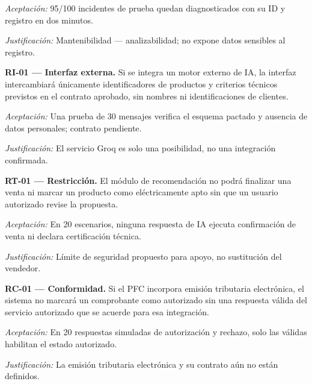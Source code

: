 \noindent\textit{Aceptación:} 95/100 incidentes de prueba quedan diagnosticados con su ID y registro en dos minutos.\par
\noindent\textit{Justificación:} Mantenibilidad — analizabilidad; no expone datos sensibles al registro.\par\medskip
\noindent\textbf{RI-01 — Interfaz externa.} Si se integra un motor externo de IA, la interfaz intercambiará únicamente identificadores de productos y criterios técnicos previstos en el contrato aprobado, sin nombres ni identificaciones de clientes.\par
\noindent\textit{Aceptación:} Una prueba de 30 mensajes verifica el esquema pactado y ausencia de datos personales; contrato pendiente.\par
\noindent\textit{Justificación:} El servicio Groq es solo una posibilidad, no una integración confirmada.\par\medskip
\noindent\textbf{RT-01 — Restricción.} El módulo de recomendación no podrá finalizar una venta ni marcar un producto como eléctricamente apto sin que un usuario autorizado revise la propuesta.\par
\noindent\textit{Aceptación:} En 20 escenarios, ninguna respuesta de IA ejecuta confirmación de venta ni declara certificación técnica.\par
\noindent\textit{Justificación:} Límite de seguridad propuesto para apoyo, no sustitución del vendedor.\par\medskip
\noindent\textbf{RC-01 — Conformidad.} Si el PFC incorpora emisión tributaria electrónica, el sistema no marcará un comprobante como autorizado sin una respuesta válida del servicio autorizado que se acuerde para esa integración.\par
\noindent\textit{Aceptación:} En 20 respuestas simuladas de autorización y rechazo, solo las válidas habilitan el estado autorizado.\par
\noindent\textit{Justificación:} La emisión tributaria electrónica y su contrato aún no están definidos.\par\medskip
